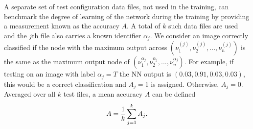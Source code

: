 A separate set of test configuration data files, not used in the training, can benchmark the degree of learning of the network during the training by providing a measurement known as the accuracy $A$.
A total of $k$ such data files are used and the $j$th file also carries a known identifier $\alpha_j$. We consider an image correctly classified if the node with the maximum output across $(\nu_1^{(j)}, \nu_2^{(j)}, ..., \nu_n^{(j)})$ is the same as the maximum output node of $(\nu_1^{\alpha_j}, \nu_2^{\alpha_j}, ..., \nu_n^{\alpha_j})$. For example, if testing on an image with label $\alpha_j = T$ the NN output is $(0.03,0.91,0.03,0.03)$, this would be a correct classification and $A_j=1$ is assigned. Otherwise, $A_j=0$.
Averaged over all $k$ test files, a mean accuracy $A$ can be defined
\begin{equation}
A = {1\over k}\sum_{j=1}^k A_j.
\label{Adef}
\end{equation}



